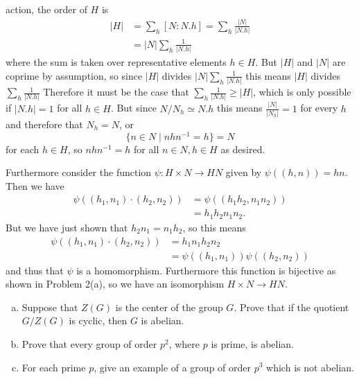 \documentclass{article}
\newcounter{Problem}
\newenvironment{Problem}{\begin{Exercise}[name={Problem},
                                          counter={Problem}]}
                        {\end{Exercise}}
\begin{document}
\begin{Answer}
\begin{enumerate}[(a)]
{    action, the order of $H$ is
    \begin{align*}
    |H| &= \sum_h [N : N . h] = \sum_h \frac{|N|}{|N . h|} \\
        &= |N| \sum_h \frac{1}{|N . h|}
    \end{align*}
    where the sum is taken over representative elements $h \in H$.
    But $|H|$ and $|N|$ are coprime by assumption, so since $|H|$ divides
    $|N| \sum_h \frac{1}{|N . h|}$ this means $|H|$ divides
    $\sum_h \frac{1}{|N . h|}$ Therefore it must be the case that
    $\sum_h \frac{1}{|N . h|} \geq |H|$, which is only possible if
    $|N . h| = 1$ for all $h \in H$. But since $N / N_h \simeq N . h$
    this means $\frac{|N|}{|N_h|} = 1$ for every $h$ and therefore
    that $N_h = N$, or 
    $$
    \{ n \in N \mid n h n^{-1} = h \} = N
    $$
    for each $h \in H$, so $n h n^{-1} = h$ for all $n \in N, h \in H$
    as desired.

    Furthermore consider the function 
    $\psi : H \times N \to HN$ given by $\psi((h, n)) = h n$. Then we
    have
    \begin{align*}
       \psi((h_1, n_1) \cdot (h_2, n_2)) 
    &= \psi((h_1 h_2, n_1 n_2)) \\
    &= h_1 h_2 n_1 n_2.
    \end{align*}
    But we have just shown that $h_2 n_1 = n_1 h_2$, so this means
    \begin{align*}
       \psi((h_1, n_1) \cdot (h_2, n_2))
    &= h_1 n_1 h_2 n_2 \\
    &= \psi((h_1, n_1)) \psi((h_2, n_2))
    \end{align*}
    and thus that $\psi$ is a homomorphism. Furthermore this function
    is bijective as shown in Problem 2(a), so we have an isomorphism
    $H \times N \to HN$.
  }
\end{enumerate}
\end{Answer}

\pagebreak

\begin{Problem}
\begin{enumerate}[(a)]
  \item{Suppose that $Z(G)$ is the center of the group $G$. Prove that if
      the quotient $G / Z(G)$ is cyclic, then $G$ is abelian.}
  \item{Prove that every group of order $p^2$, where $p$ is prime, is
      abelian.}
  \item{For each prime $p$, give an example of a group of order $p^3$
      which is not abelian.}
\end{enumerate}
\end{Problem}
\end{document}
